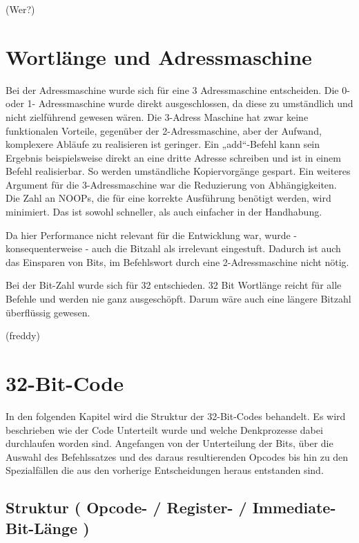 \documentclass[paper=a4,fontsize=12pt,twocolumn]{scrreprt}
\begin{document}
\kant[5]

(Wer?)



\section{Wortlänge und Adressmaschine}

Bei der Adressmaschine wurde sich für eine 3 Adressmaschine entscheiden.
Die 0- oder 1- Adressmaschine wurde direkt ausgeschlossen, da diese zu umständlich und nicht zielführend gewesen wären.
Die 3-Adress Maschine hat zwar keine funktionalen Vorteile, gegenüber der 2-Adressmaschine, aber der Aufwand, komplexere Abläufe zu realisieren ist geringer.
Ein „add“-Befehl kann sein Ergebnis beispielsweise direkt an eine dritte Adresse schreiben und ist in einem Befehl realisierbar.
So werden umständliche Kopiervorgänge gespart.
Ein weiteres Argument für die 3-Adressmaschine war die Reduzierung von Abhängigkeiten.
Die Zahl an NOOPs, die für eine korrekte Ausführung benötigt werden, wird minimiert.
Das ist sowohl schneller, als auch einfacher in der Handhabung.

Da hier Performance nicht relevant für die Entwicklung war, wurde - konsequenterweise - auch die Bitzahl als irrelevant eingestuft.
Dadurch ist auch das Einsparen von Bits, im Befehlswort durch eine 2-Adressmaschine nicht nötig.

Bei der Bit-Zahl wurde sich für 32 entschieden. 32 Bit Wortlänge reicht für alle Befehle und werden nie ganz ausgeschöpft. Darum wäre auch eine längere Bitzahl überflüssig gewesen.

(freddy)



\section{32-Bit-Code}

In den folgenden Kapitel wird die Struktur der 32-Bit-Codes behandelt. Es wird beschrieben wie der Code Unterteilt wurde und welche Denkprozesse dabei durchlaufen worden sind. Angefangen von der Unterteilung der Bits, über die Auswahl des Befehlssatzes und des daraus resultierenden Opcodes bis hin zu den Spezialfällen die aus den vorherige Entscheidungen heraus entstanden sind. 

\subsection{Struktur ( Opcode- / Register- / Immediate- Bit-Länge )}
\end{document}
